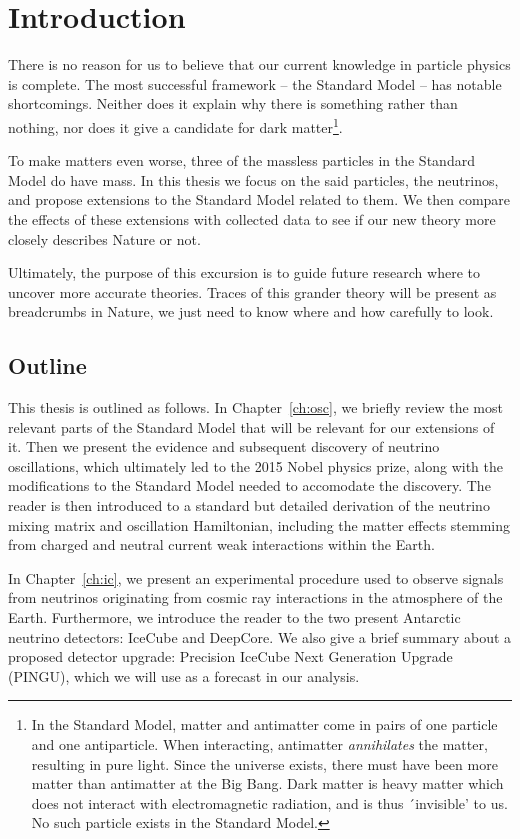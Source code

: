 \chapter{Introduction}
There is no reason for us to believe that our current knowledge in particle physics is complete.
The most successful framework -- the Standard Model -- has notable shortcomings. Neither does it 
explain why there is something rather than nothing, nor does it give a candidate for dark matter\footnote{In the Standard Model,
matter and antimatter come in pairs of one particle and one antiparticle. When interacting,
antimatter \emph{annihilates} the matter, resulting in pure light. Since the universe exists,
there must have been more matter than antimatter at the Big Bang. %
Dark matter is heavy matter which does not interact
with electromagnetic radiation, and is thus ´invisible' to us. 
No such particle exists in the Standard Model.}.

To make matters even worse, three of the massless particles in the Standard Model do have mass.
In this thesis we focus on the said particles, the neutrinos, and propose extensions to the Standard Model
related to them. We then compare the effects of these extensions with collected data to see 
if our new theory more closely describes Nature or not. 

Ultimately, the purpose of this excursion is to guide future research where to uncover more accurate theories.
Traces of this grander theory will be present as breadcrumbs in Nature, we just need to know where 
and how carefully to look. 

\section{Outline}
This thesis is outlined as follows. In Chapter~\ref{ch:osc}, we briefly review the most relevant parts 
of the Standard Model that will be relevant for our extensions of it. Then we present the evidence and 
subsequent discovery of neutrino oscillations, which ultimately led to the 2015 Nobel physics prize, 
along with the modifications to the Standard Model needed to accomodate the discovery. The 
reader is then introduced to a standard but detailed derivation of the neutrino mixing matrix
and oscillation Hamiltonian, including the matter 
effects stemming from charged and neutral current weak interactions within the Earth.

In Chapter~\ref{ch:ic}, we present an experimental procedure used to observe signals from neutrinos originating
from cosmic ray interactions in the atmosphere of the Earth. Furthermore, we introduce the reader to 
the two present Antarctic neutrino detectors: IceCube and DeepCore. We also give a brief summary 
about a proposed detector upgrade: Precision IceCube Next Generation Upgrade (PINGU), which 
we will use as a forecast in our analysis.

